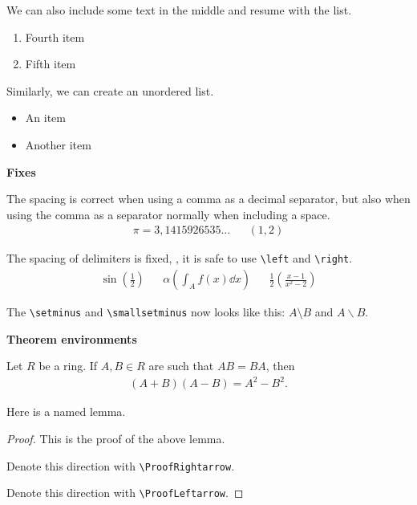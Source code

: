 \documentclass[parskip]{myarticle}
\begin{document}
We can also include some text in the middle and resume with the list.

\begin{enumerate}[resume*]
    \item Fourth item
    \item Fifth item
\end{enumerate}

Similarly, we can create an unordered list.

\begin{itemize}
    \item An item
    \item Another item
\end{itemize}

\textbf{Fixes}

The spacing is correct when using a comma as a decimal separator, but also when using the comma as a separator normally when including a space.
\begin{align*}
    \pi = 3,1415926535\dots && (1, 2)
\end{align*}

The spacing of delimiters is fixed, \ie, it is safe to use \verb|\left| and \verb|\right|.
\begin{align*}
    \sin \left(\frac{1}{2}\right) && \alpha \left( \int_A f(x) \dd x \right) && \frac{1}{2} \left( \frac{x - 1}{x^2 - 2} \right)
\end{align*}

The \verb|\setminus| and \verb|\smallsetminus| now looks like this: $A \setminus B$ and $A \smallsetminus B$.

\textbf{Theorem environments}

\begin{theorem}\label{thm:first}
Let $R$ be a ring. If $A, B \in R$ are such that $AB = BA$, then
\begin{align*}
    (A + B)(A - B) = A^2 - B^2.
\end{align*}
\end{theorem}

\begin{lemma}\label{lem:second}
Here is a named lemma.
\end{lemma}

\begin{proof}
This is the proof of the above lemma.

\ProofRightarrow Denote this direction with \verb|\ProofRightarrow|.

\ProofLeftarrow Denote this direction with \verb|\ProofLeftarrow|.
\end{proof}
\end{document}
